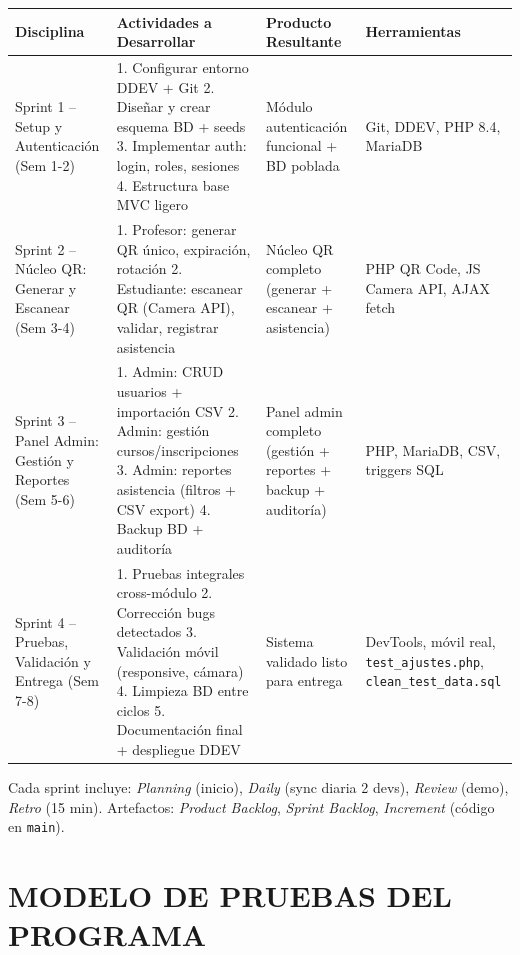\documentclass[12pt, letterpaper, oneside]{report}
\begin{document}
\begin{center}
\small
\begin{tabularx}{\textwidth}{|p{2.5cm}|X|X|X|}
\hline
\textbf{Disciplina} & \textbf{Actividades a Desarrollar} & \textbf{Producto Resultante} & \textbf{Herramientas} \\
\hline
Sprint 1 -- Setup y Autenticaci\'on (Sem 1-2) &
1. Configurar entorno DDEV + Git
2. Dise\~nar y crear esquema BD + seeds
3. Implementar auth: login, roles, sesiones
4. Estructura base MVC ligero &
M\'odulo autenticaci\'on funcional + BD poblada &
Git, DDEV, PHP 8.4, MariaDB \\
\hline
Sprint 2 -- N\'ucleo QR: Generar y Escanear (Sem 3-4) &
1. Profesor: generar QR \'unico, expiraci\'on, rotaci\'on
2. Estudiante: escanear QR (Camera API), validar, registrar asistencia &
N\'ucleo QR completo (generar + escanear + asistencia) &
PHP QR Code, JS Camera API, AJAX fetch \\
\hline
Sprint 3 -- Panel Admin: Gesti\'on y Reportes (Sem 5-6) &
1. Admin: CRUD usuarios + importaci\'on CSV
2. Admin: gesti\'on cursos/inscripciones
3. Admin: reportes asistencia (filtros + CSV export)
4. Backup BD + auditor\'ia &
Panel admin completo (gesti\'on + reportes + backup + auditor\'ia) &
PHP, MariaDB, CSV, triggers SQL \\
\hline
Sprint 4 -- Pruebas, Validaci\'on y Entrega (Sem 7-8) &
1. Pruebas integrales cross-m\'odulo
2. Correcci\'on bugs detectados
3. Validaci\'on m\'ovil (responsive, c\'amara)
4. Limpieza BD entre ciclos
5. Documentaci\'on final + despliegue DDEV &
Sistema validado listo para entrega &
DevTools, m\'ovil real, \texttt{test\_ajustes.php}, \texttt{clean\_test\_data.sql} \\
\hline
\end{tabularx}
\end{center}

Cada sprint incluye: \textit{Planning} (inicio), \textit{Daily} (sync diaria 2 devs), \textit{Review} (demo), \textit{Retro} (15 min). Artefactos: \textit{Product Backlog}, \textit{Sprint Backlog}, \textit{Increment} (código en \texttt{main}).

\newpage

\chapter{MODELO DE PRUEBAS DEL PROGRAMA}
\end{document}
